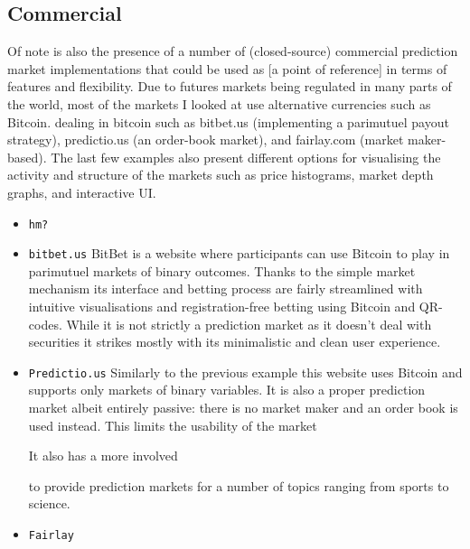 \documentclass[bsc,frontabs,twoside,singlespacing,parskip,deptreport]{infthesis}     %
\begin{document}

\subsection{ Commercial }
	Of note is also the presence of a number of (closed-source) commercial prediction market implementations that could be used as [a point of reference] in terms of features and flexibility. Due to futures markets being regulated in many parts of the world, most of the markets I looked at use alternative currencies such as Bitcoin. 
 dealing in bitcoin such as bitbet.us (implementing a parimutuel payout strategy), predictio.us (an order-book market), and fairlay.com (market maker-based). The last few examples also present different options for visualising the activity and structure of the markets such as price histograms, market depth graphs, and interactive UI.
\begin{itemize}

\item {\tt hm? }

\item {\tt bitbet.us}
	BitBet is a website where participants can use Bitcoin to play in parimutuel markets of binary outcomes. Thanks to the simple market mechanism its interface and betting process are fairly streamlined with intuitive visualisations and registration-free betting using Bitcoin and QR-codes. While it is not strictly a prediction market as it doesn't deal with securities it strikes mostly with its minimalistic and clean user experience. 

\item {\tt Predictio.us}
	Similarly to the previous example this website uses Bitcoin and supports only markets of binary variables. It is also a proper prediction market albeit entirely passive: there is no market maker and an order book is used instead. This limits the usability of the market 

	It also has a more involved 

to provide prediction markets for a number of topics ranging from sports to science. 
\item {\tt Fairlay}	
	

\end{itemize}
\end{document}
